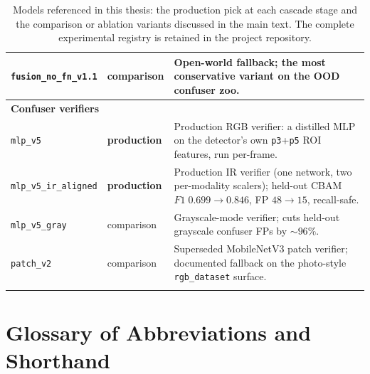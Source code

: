 \begin{longtable}{p{}lp{}}
\texttt{fusion\_no\_fn\_v1.1} & comparison & Open-world fallback; the most conservative variant on the OOD confuser zoo. \\
\midrule
\multicolumn{3}{l}{\textbf{Confuser verifiers}} \\
\midrule
\texttt{mlp\_v5} & \textbf{production} & Production RGB verifier: a distilled MLP on the detector's own \texttt{p3}+\texttt{p5} ROI features, run per-frame. \\
\texttt{mlp\_v5\_ir\_aligned} & \textbf{production} & Production IR verifier (one network, two per-modality scalers); held-out CBAM $F1\;0.699\to0.846$, FP $48\to15$, recall-safe. \\
\texttt{mlp\_v5\_gray} & comparison & Grayscale-mode verifier; cuts held-out grayscale confuser FPs by ${\sim}96\%$. \\
\texttt{patch\_v2} & comparison & Superseded MobileNetV3 patch verifier; documented fallback on the photo-style \texttt{rgb\_dataset} surface. \\
\bottomrule
\caption{Models referenced in this thesis: the production pick at each cascade stage and the comparison or ablation variants discussed in the main text. The complete experimental registry is retained in the project repository.}
\label{tab:models_evaluated}
\end{longtable}
\normalsize


\chapter{Glossary of Abbreviations and Shorthand}
\label{app:glossary}

